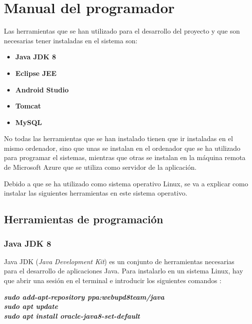 \section{Manual del programador}

Las herramientas que se han utilizado para el desarrollo del proyecto y que son necesarias tener instaladas en el sistema son:

\begin{itemize}
	\tightlist
	\item
	\textbf{Java JDK 8}
	\item
	\textbf{Eclipse JEE}
	\item
	\textbf{Android Studio}
	\item
	\textbf{Tomcat}
	\item
	\textbf{MySQL}
\end{itemize}

No todas las herramientas que se han instalado tienen que ir instaladas en el mismo ordenador, sino que unas se instalan en el ordenador que se ha utilizado para programar el sistemas, mientras que otras se instalan en la máquina remota de Microsoft Azure que se utiliza como servidor de la aplicación.

Debido a que se ha utilizado como sistema operativo Linux, se va a explicar como instalar las siguientes herramientas en este sistema operativo.

\subsection{Herramientas de programación}

\subsubsection{Java JDK 8} \label{{jdk}}

Java JDK (\textit{Java Development Kit}) es un conjunto de herramientas necesarias para el desarrollo de aplicaciones Java. Para instalarlo en un sistema Linux, hay que abrir una sesión en el terminal e introducir los siguientes comandos \cite{jdk:install}:

\begin{center}
	\textit{\textbf{sudo add-apt-repository ppa:webupd8team/java}} \\
	\textbf{\textit{sudo apt update}} \\
	\textit{\textbf{sudo apt install oracle-java8-set-default}}
\end{center}

